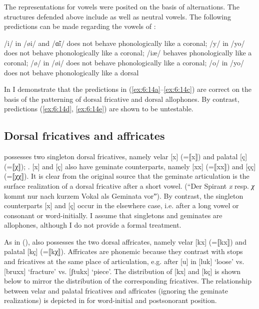 The representations for vowels were posited on the basis of  alternations. The structures defended above include  as well as neutral vowels. The following predictions can be made regarding the vowels of :\largerpage[-1]\pagebreak

\ea%
\label{ex:6:14}
\ea\label{ex:6:14a}/i/ in /øi/ and /\~ɑi/ does not behave phonologically like a coronal;
\ex\label{ex:6:14b}/y/ in /yo/ does not behave phonologically like a coronal;
\ex\label{ex:6:14c}/iæ/ behaves phonologically like a coronal;
\ex\label{ex:6:14d}/ø/ in /øi/ does not behave phonologically like a coronal;
\ex\label{ex:6:14e}/o/ in /yo/ does not behave phonologically like a dorsal
\z 
\z 

In  I demonstrate that the predictions in (\ref{ex:6:14a}--\ref{ex:6:14c}) are correct on the basis of the patterning of dorsal fricative and dorsal  allophones. By contrast, predictions (\ref{ex:6:14d}, \ref{ex:6:14e}) are shown to be untestable.

\subsection{Dorsal fricatives and affricates}\label{sec:6.2.2}

 possesses two singleton dorsal fricatives, namely velar [x] (=⟦x⟧) and palatal [ç] (=⟦χ⟧); \citet[14]{Wipf1910}. [x] and [ç] also have geminate counterparts, namely [xx] (=⟦xx⟧) and [çç] (=⟦χχ⟧). It is clear from the original source \citep[16]{Wipf1910} that the geminate articulation is the surface realization of a dorsal fricative after a short vowel. (“Der Spirant \textit{x} resp. \textit{χ} kommt nur nach kurzem Vokal als Geminata vorˮ). By contrast, the singleton counterparts [x] and [ç] occur in the elsewhere case, i.e. after a long vowel or consonant or word-initially. I assume that singletons and geminates are allophones, although I do not provide a formal treatment.

As in  (),  also possesses the two dorsal affricates, namely velar [kx] (=⟦kx⟧) and palatal [kç] (=⟦kχ⟧). Affricates are phonemic because they contrast with stops and fricatives at the same place of articulation, e.g. after [u] in [luk] ‘loose’ vs. [bruxx] ‘fracture’ vs. [ʃtukx] ‘piece’. The distribution of [kx] and [kç] is shown below to mirror the distribution of the corresponding fricatives. The relationship between velar and palatal fricatives and affricates (ignoring the geminate realizations) is depicted in  for word-initial and postsonorant position.

